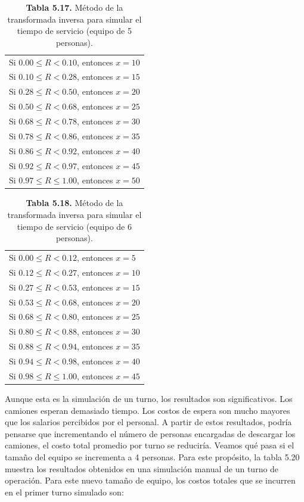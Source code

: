 \documentclass[11pt,letterpaper]{report}
\begin{document}
\begin{table}[H]
\centering
\caption*{\textbf{Tabla 5.17.} Método de la transformada inversa para simular el tiempo de servicio (equipo de 5 personas).}
\begin{tabular}{l}
Si $0.00 \le R < 0.10$, entonces $x=10$ \\
Si $0.10 \le R < 0.28$, entonces $x=15$ \\
Si $0.28 \le R < 0.50$, entonces $x=20$ \\
Si $0.50 \le R < 0.68$, entonces $x=25$ \\
Si $0.68 \le R < 0.78$, entonces $x=30$ \\
Si $0.78 \le R < 0.86$, entonces $x=35$ \\
Si $0.86 \le R < 0.92$, entonces $x=40$ \\
Si $0.92 \le R < 0.97$, entonces $x=45$ \\
Si $0.97 \le R \le 1.00$, entonces $x=50$ \\
\end{tabular}
\end{table}

\begin{table}[H]
\centering
\caption*{\textbf{Tabla 5.18.} Método de la transformada inversa para simular el tiempo de servicio (equipo de 6 personas).}
\begin{tabular}{l}
Si $0.00 \le R < 0.12$, entonces $x=5$ \\
Si $0.12 \le R < 0.27$, entonces $x=10$ \\
Si $0.27 \le R < 0.53$, entonces $x=15$ \\
Si $0.53 \le R < 0.68$, entonces $x=20$ \\
Si $0.68 \le R < 0.80$, entonces $x=25$ \\
Si $0.80 \le R < 0.88$, entonces $x=30$ \\
Si $0.88 \le R < 0.94$, entonces $x=35$ \\
Si $0.94 \le R < 0.98$, entonces $x=40$ \\
Si $0.98 \le R \le 1.00$, entonces $x=45$ \\
\end{tabular}
\end{table}

Aunque esta es la simulación de un turno, los resultados son significativos.
Los camiones esperan demasiado tiempo. Los costos de espera son mucho
mayores que los salarios percibidos por el personal. A partir de estos
resultados, podría pensarse que incrementando el número de personas
encargadas de descargar los camiones, el costo total promedio por turno se
reduciría. Veamos qué pasa si el tamaño del equipo se incrementa a 4
personas. Para este propósito, la tabla 5.20 muestra los resultados
obtenidos en una simulación manual de un turno de operación. Para este nuevo
tamaño de equipo, los costos totales que se incurren en el primer turno
simulado son:
\end{document}

